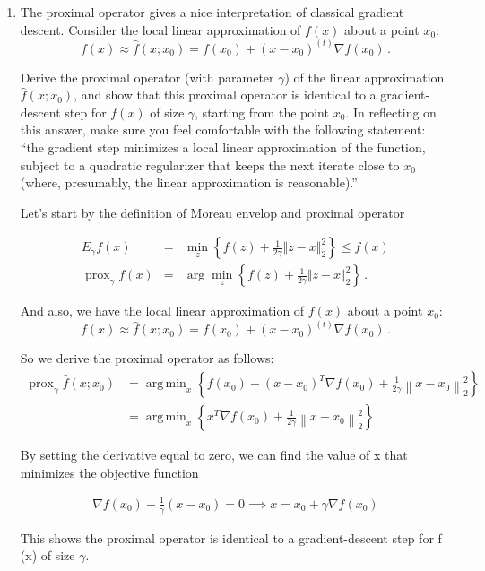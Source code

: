 \documentclass{article}
\DeclareMathOperator*{\argmin}{arg\,min}
\DeclareMathOperator*{\prox}{prox}
\newcommand{\norm}[1]{\left\lVert#1\right\rVert}
\newcommand{\enorm}[1]{\Vert #1 \Vert_2}
\begin{document}
\begin{enumerate}[label=(\Alph*)]
\item
The proximal operator gives a nice interpretation of classical gradient descent.  Consider the local linear approximation of $f(x)$ about a point $x_0$:
$$
f(x) \approx \hat{f}(x; x_0) = f(x_0) + (x - x_0)^{(t)} \nabla f(x_0) \, .
$$

Derive the proximal operator (with parameter $\gamma$) of the linear approximation $\hat{f}(x; x_0)$, and show that this proximal operator is identical to a gradient-descent step for $f(x)$ of size $\gamma$, starting from the point $x_0$.  In reflecting on this answer, make sure you feel comfortable with the following statement: ``the gradient step minimizes a local linear approximation of the function, subject to a quadratic regularizer that keeps the next iterate close to $x_0$ (where, presumably, the linear approximation is reasonable).''


{\color{blue}

Let's start by the definition of Moreau envelop and proximal operator

\begin{eqnarray}
E_{\gamma} f(x) &=& \min_{z } \left\{f(z) + \frac{1}{2\gamma} \enorm{z - x}^2  \right\}  \leq f(x) \\
\prox_{\gamma} f(x) &=& \arg \min_{z } \left\{  f(z)+ \frac{1}{2\gamma} \enorm{z - x}^2  \right\} \, .
\end{eqnarray}

And also, we have the local linear approximation of $f(x)$ about a point $x_0$:
$$
f(x) \approx \hat{f}(x; x_0) = f(x_0) + (x - x_0)^{(t)} \nabla f(x_0) \, .
$$


So we derive the proximal operator as follows:
\begin{align}
\prox_\gamma \hat{f}(x;x_0) &= \argmin_x \left \{ f(x_0) + (x - x_0)^T\nabla f(x_0) + \frac{1}{2\gamma} \norm{x-x_0}_2^2  \right \} \\
&= \argmin_x \left \{ x^T \nabla f(x_0) + \frac{1}{2\gamma} \norm{x-x_0}_2^2  \right \}
\end{align}

By setting the derivative equal to zero, we can find the value of x that minimizes the objective function

\begin{align}
	\nabla f(x_0) - \frac{1}{\gamma}(x-x_0) = 0
	\implies x = x_0 + \gamma \nabla f(x_0)
\end{align}

 This shows the proximal operator is identical to a gradient-descent step for f (x) of size $\gamma$.

}
\end{enumerate}
\end{document}
